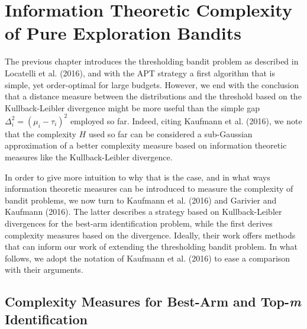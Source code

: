 \documentclass[11pt,]{article}
\begin{document}
\section{\texorpdfstring{Information Theoretic Complexity of Pure
Exploration Bandits
\label{chap:KullbackLeiblerPureExploration}}{Information Theoretic Complexity of Pure Exploration Bandits }}\label{information-theoretic-complexity-of-pure-exploration-bandits}

The previous chapter introduces the thresholding bandit problem as
described in Locatelli et al. (2016), and with the APT strategy a first
algorithm that is simple, yet order-optimal for large budgets. However,
we end with the conclusion that a distance measure between the
distributions and the threshold based on the Kullback-Leibler divergence
might be more useful than the simple gap
\(\Delta^2_i = (\mu_i - \tau_i)^2\) employed so far. Indeed, citing
Kaufmann et al. (2016), we note that the complexity \(H\) used so far
can be considered a sub-Gaussian approximation of a better complexity
measure based on information theoretic measures like the
Kullback-Leibler divergence.

In order to give more intuition to why that is the case, and in what
ways information theoretic measures can be introduced to measure the
complexity of bandit problems, we now turn to Kaufmann et al. (2016) and
Garivier and Kaufmann (2016). The latter describes a strategy based on
Kullback-Leibler divergences for the best-arm identification problem,
while the first derives complexity measures based on the divergence.
Ideally, their work offers methods that can inform our work of extending
the thresholding bandit problem. In what follows, we adopt the notation
of Kaufmann et al. (2016) to ease a comparison with their arguments.

\subsection{\texorpdfstring{Complexity Measures for Best-Arm and
Top-\emph{m} Identification
\label{sec:KaufmannEtAl2016}}{Complexity Measures for Best-Arm and Top-m Identification }}\label{complexity-measures-for-best-arm-and-top-m-identification}
\end{document}
